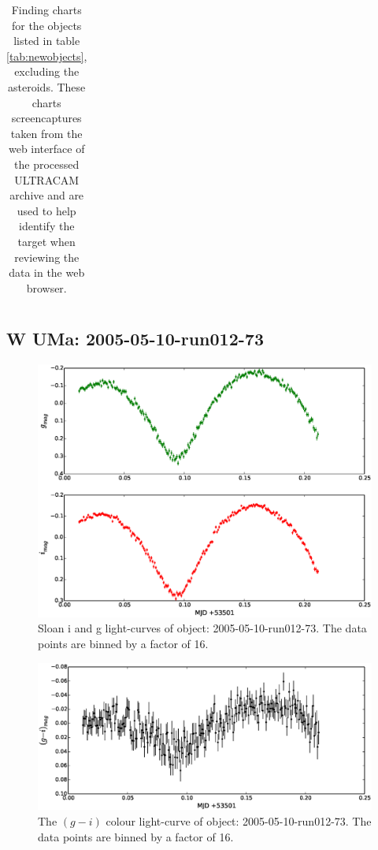 \begin{table}
\begin{tabular}{ccc}
   \\
  \end{tabular}
  \caption{Finding charts for the objects listed in table \ref{tab:newobjects}, excluding the asteroids. These charts screencaptures taken from the web interface of the processed ULTRACAM archive and are used to help identify the target when reviewing the data in the web browser.}
  \label{tab:findingcharts}
\end{table}

\newpage

\subsection{{W UMa}: 2005-05-10-run012-73}

  \begin{figure}
    \center
    \includegraphics[width=120mm]{images/2005-05-10-run012-lightcurve-bin16.eps} 
    \caption{Sloan i and g light-curves of object: 2005-05-10-run012-73. The data points are binned by a factor of 16. }
    \label{fig:2005-05-10-run012}
  \end{figure}
  
  \begin{figure}
    \center
    \includegraphics[width=120mm]{images/2005-05-10-run012-colourcurve-bin16.eps} 
    \caption{The $(g - i)$ colour light-curve of object: 2005-05-10-run012-73. The data points are binned by a factor of 16. }
    \label{fig:2005-05-10-run012-colour} 
  \end{figure}
  

